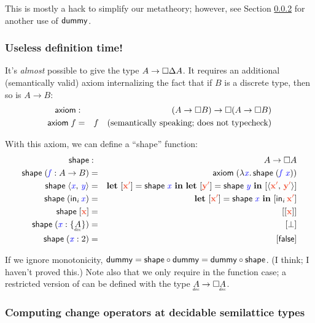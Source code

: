 \documentclass{article}
\newcommand{\dummy}{\ms{dummy}}
\newcommand{\shape}{\ms{shape}}
\begin{document}
This is mostly a hack to simplify our metatheory; however, see Section \ref{sec:change-operators-at-decidable-semilattice-types} for another use of $\mathsf{dummy}$.


\subsubsection{Useless definition time!}

It's \emph{almost} possible to give \dummy{} the type $A \to \square{\Delta A}$.
%
It requires an additional (semantically valid) axiom internalizing the fact that if $B$ is a discrete type, then so is $A \to B$:
%
\begin{eqnarray*}
  \mathsf{axiom} &:& (A \to \square{B}) \to \square{(}A \to \square{B})\\
  \mathsf{axiom}\;f &=& f \quad\text{(semantically speaking; does not typecheck)}
\end{eqnarray*}

With this axiom, we can define a ``shape'' function:
%
\begin{eqnarray*}
  \shape &:& A \to \Disc{A}\\
  \shape\; (\m{f} : A \to B) &=&
    \ms{axiom}\; (\lam{\m{x}} \shape\; (\m{f}\;\m{x}))\\
  \shape\; \pair{\m{x}}{\m{y}} &=&
    \letdisc{\d{x'}}{\shape\;\m{x}}
    \letdisc{\d{y'}}{\shape\;\m{y}}
    \disc{\pair{\d{x'}}{\d{y'}}}\\
  \shape\; (\inj{i}{\m{x}}) &=&
    \letdisc{\d{x'}}{\shape\;\m x} \disc{\inj{i}{\d{x'}}}\\
  \shape\; \disc{\d{x}} &=& \disc{\disc{\d{x}}}\\
  \shape\; (\m{x} : \Seteq{A}) &=& \disc{\bot}\\
  \shape\; (\m{x} : 2) &=& \disc{\efalse}
\end{eqnarray*}

If we ignore monotonicity, $\dummy = \ms{shape} \circ \dummy = \dummy \circ \ms{shape}$. (I think; I haven't proved this.)
%
Note also that we only require  in the function case; a restricted version of  can be defined with the type $\eq{A} \to \Disc{\eq{A}}$.


\subsubsection{Computing change operators at decidable semilattice types}
\label{sec:change-operators-at-decidable-semilattice-types}
\end{document}
